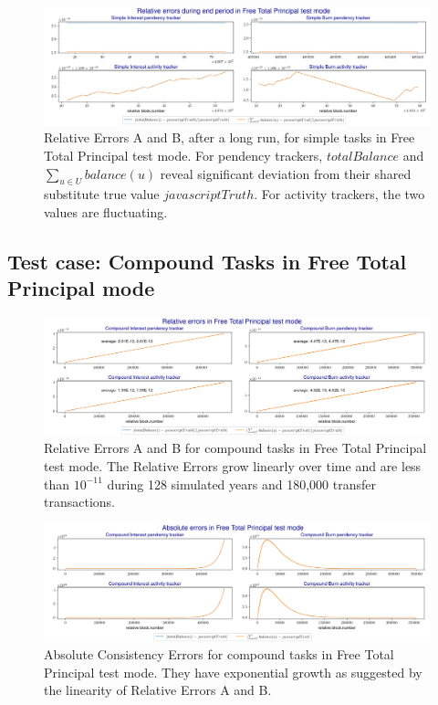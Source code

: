 \documentclass{article}
\begin{document}
\begin{figure}[H]
  \centering
  \includegraphics[width=5.3in]{images/6.3_free_sim_relative_end.jpg}
  \caption{Relative Errors A and B, after a long run, for simple tasks 
  in Free Total Principal test mode. For pendency trackers, $totalBalance$ 
  and $\sum_{u \in U}balance(u)$ reveal significant deviation from their 
  shared substitute true value $javascriptTruth$.
  For activity trackers, the two values are fluctuating. 
  }
  \label{fig:free_sim_relative_end_case}
\end{figure}

\subsection{Test case: Compound Tasks in Free Total Principal mode}

\begin{figure}[H]
  \centering
  \includegraphics[width=5.3in]{images/6.3_free_com_relative.jpg}
  \caption{Relative Errors A and B for compound tasks 
  in Free Total Principal test mode. 
  The Relative Errors grow linearly over time 
  and are less than $10^{-11}$ during 128 simulated years and 
  180,000 transfer transactions.
  }
  \label{fig:free_com_relative_case}
\end{figure}

\begin{figure}[H]
  \centering
  \includegraphics[width=5.3in]{images/6.3_free_com_absolute.jpg}
  \caption{Absolute Consistency Errors for compound tasks 
  in Free Total Principal test mode. They  
  have exponential growth as suggested by the linearity of Relative Errors A and B.
  }
  \label{fig:free_com_absolute_case}
\end{figure}
\end{document}
